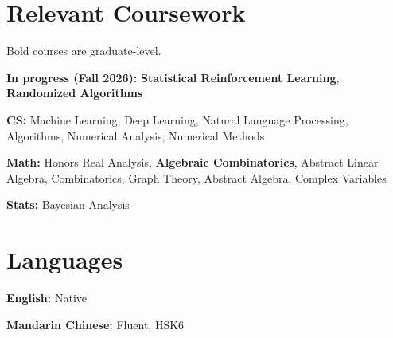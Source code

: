 \documentclass[letterpaper,11pt]{article}
\begin{document}
\section{Relevant Coursework}
{\small Bold courses are graduate-level.}\par
\textbf{In progress (Fall 2026):} \textbf{Statistical Reinforcement Learning}, \textbf{Randomized Algorithms}\par
\textbf{CS:} Machine Learning, Deep Learning, Natural Language Processing, Algorithms, Numerical Analysis, Numerical Methods\par
\textbf{Math:} Honors Real Analysis, \textbf{Algebraic Combinatorics}, Abstract Linear Algebra, Combinatorics, Graph Theory, Abstract Algebra, Complex Variables\par
\textbf{Stats:} Bayesian Analysis\par
\section{Languages}
\textbf{English:} Native\par
\textbf{Mandarin Chinese:} Fluent, HSK6\par
\end{document}
